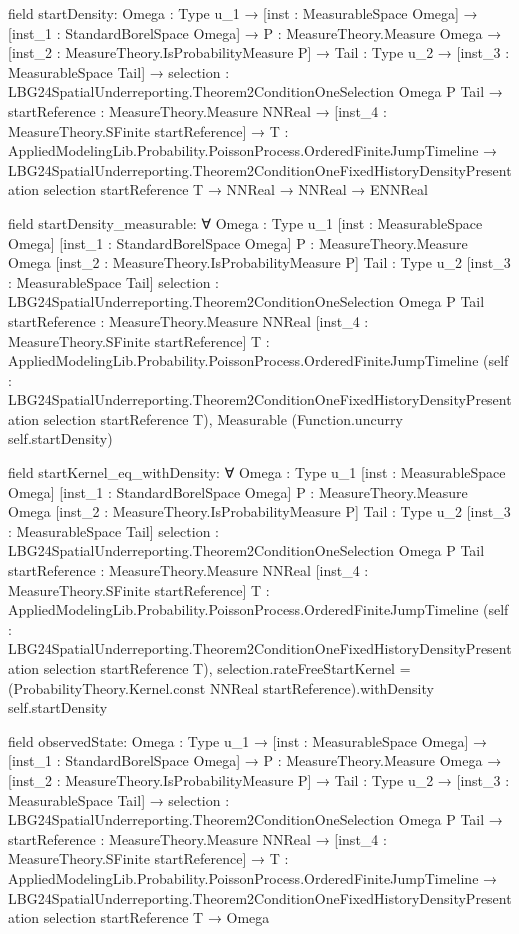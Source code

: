 \documentclass[10pt]{article}
\begin{document}
\begin{ReviewVerbatim}
field startDensity:
{Omega : Type u_1} →
  [inst : MeasurableSpace Omega] →
    [inst_1 : StandardBorelSpace Omega] →
      {P : MeasureTheory.Measure Omega} →
        [inst_2 : MeasureTheory.IsProbabilityMeasure P] →
          {Tail : Type u_2} →
            [inst_3 : MeasurableSpace Tail] →
              {selection : LBG24SpatialUnderreporting.Theorem2ConditionOneSelection Omega P Tail} →
                {startReference : MeasureTheory.Measure NNReal} →
                  [inst_4 : MeasureTheory.SFinite startReference] →
                    {T : AppliedModelingLib.Probability.PoissonProcess.OrderedFiniteJumpTimeline} →
                      LBG24SpatialUnderreporting.Theorem2ConditionOneFixedHistoryDensityPresentation selection
                          startReference T →
                        NNReal → NNReal → ENNReal

field startDensity_measurable:
∀ {Omega : Type u_1} [inst : MeasurableSpace Omega] [inst_1 : StandardBorelSpace Omega]
  {P : MeasureTheory.Measure Omega} [inst_2 : MeasureTheory.IsProbabilityMeasure P] {Tail : Type u_2}
  [inst_3 : MeasurableSpace Tail] {selection : LBG24SpatialUnderreporting.Theorem2ConditionOneSelection Omega P Tail}
  {startReference : MeasureTheory.Measure NNReal} [inst_4 : MeasureTheory.SFinite startReference]
  {T : AppliedModelingLib.Probability.PoissonProcess.OrderedFiniteJumpTimeline}
  (self : LBG24SpatialUnderreporting.Theorem2ConditionOneFixedHistoryDensityPresentation selection startReference T),
  Measurable (Function.uncurry self.startDensity)

field startKernel_eq_withDensity:
∀ {Omega : Type u_1} [inst : MeasurableSpace Omega] [inst_1 : StandardBorelSpace Omega]
  {P : MeasureTheory.Measure Omega} [inst_2 : MeasureTheory.IsProbabilityMeasure P] {Tail : Type u_2}
  [inst_3 : MeasurableSpace Tail] {selection : LBG24SpatialUnderreporting.Theorem2ConditionOneSelection Omega P Tail}
  {startReference : MeasureTheory.Measure NNReal} [inst_4 : MeasureTheory.SFinite startReference]
  {T : AppliedModelingLib.Probability.PoissonProcess.OrderedFiniteJumpTimeline}
  (self : LBG24SpatialUnderreporting.Theorem2ConditionOneFixedHistoryDensityPresentation selection startReference T),
  selection.rateFreeStartKernel = (ProbabilityTheory.Kernel.const NNReal startReference).withDensity self.startDensity

field observedState:
{Omega : Type u_1} →
  [inst : MeasurableSpace Omega] →
    [inst_1 : StandardBorelSpace Omega] →
      {P : MeasureTheory.Measure Omega} →
        [inst_2 : MeasureTheory.IsProbabilityMeasure P] →
          {Tail : Type u_2} →
            [inst_3 : MeasurableSpace Tail] →
              {selection : LBG24SpatialUnderreporting.Theorem2ConditionOneSelection Omega P Tail} →
                {startReference : MeasureTheory.Measure NNReal} →
                  [inst_4 : MeasureTheory.SFinite startReference] →
                    {T : AppliedModelingLib.Probability.PoissonProcess.OrderedFiniteJumpTimeline} →
                      LBG24SpatialUnderreporting.Theorem2ConditionOneFixedHistoryDensityPresentation selection
                          startReference T →
                        Omega


\end{ReviewVerbatim}
\end{document}
